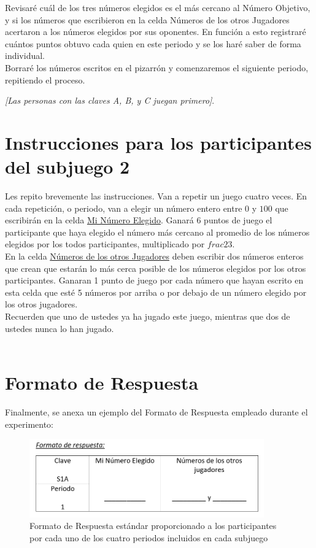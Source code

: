 Revisaré cuál de los tres números elegidos es el más cercano al Número Objetivo, y si los números que escribieron en la celda Números de los otros Jugadores acertaron a los números elegidos por sus oponentes. En función a esto registraré cuántos puntos obtuvo cada quien en este periodo y se los haré saber de forma individual.\\

Borraré los números escritos en el pizarrón y comenzaremos el siguiente periodo, repitiendo el proceso.\\

\begin{center}
\textit{[Las personas con las claves A, B, y C juegan primero]}.\\
\end{center}

\section{Instrucciones para los participantes del subjuego 2}

Les repito brevemente las instrucciones. Van a repetir un juego cuatro veces. En cada repetición, o periodo, van a elegir un número entero entre $0$ y $100$ que escribirán en la celda \underline{Mi Número Elegido}. Ganará 6 puntos de juego el participante que haya elegido el número más cercano al promedio de los números elegidos por los todos participantes, multiplicado por $frac{2}{3}$.\\

En la celda \underline{Números de los otros Jugadores} deben escribir dos números enteros que crean que estarán lo más cerca posible de los números elegidos por los otros participantes. Ganaran 1 punto de juego por cada número que hayan escrito en esta celda que esté 5 números por arriba o por debajo de un número elegido por los otros jugadores.\\

Recuerden que uno de ustedes ya ha jugado este juego, mientras que dos de ustedes nunca lo han jugado.\\
 
\section{Formato de Respuesta}

Finalmente, se anexa un ejemplo del Formato de Respuesta empleado durante el experimento:

\begin{figure}[th]
\centering
\includegraphics[width=0.90\textwidth]{Figures/FormatoRespuesta} 
\caption[Formato de Respuesta muestra empleado en el experimento]{Formato de Respuesta estándar proporcionado a los participantes por cada uno de los cuatro periodos incluidos en cada subjuego}
\label{fig:DiferenciasNormalizadas_Subjuego1}
\end{figure}
